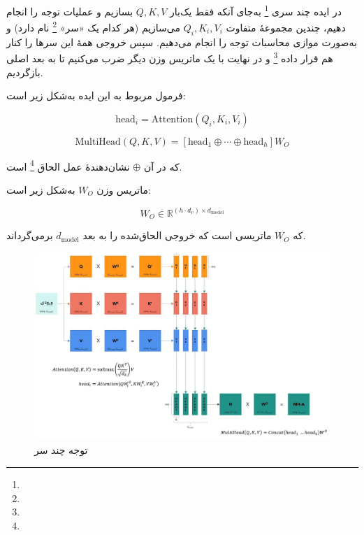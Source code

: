 در ایده چند سری \footnote{}  
به‌جای آنکه فقط یک‌بار \( Q, K, V \) بسازیم و عملیات توجه را انجام دهیم، چندین مجموعهٔ متفاوت \( Q_i, K_i, V_i \) می‌سازیم (هر کدام یک «سر» \footnote{} نام دارد) و به‌صورت موازی محاسبات توجه را انجام می‌دهیم. سپس خروجی همهٔ این سرها را کنار هم قرار داده \footnote{} و در نهایت با یک ماتریس وزن دیگر ضرب می‌کنیم تا به بعد اصلی بازگردیم.

فرمول مربوط به این ایده به‌شکل زیر است:


\begin{equation}
	\text{head}_i = \text{Attention}(Q_i, K_i, V_i)
	\label{eq:head_i}
\end{equation}


\begin{equation}
	\text{MultiHead}(Q, K, V) = [\text{head}_1 \oplus \cdots \oplus \text{head}_h] W_O
	\label{eq:multihead}
\end{equation}

که در آن \( \oplus \) نشان‌دهندهٔ عمل الحاق \footnote{} است.

ماتریس وزن \( W_O \) به‌شکل زیر است:

\[
W_O \in \mathbb{R}^{(h \cdot d_v) \times d_{\text{model}}}
\]

که \( W_O \) ماتریسی است که خروجی الحاق‌شده را به بعد \( d_{\text{model}} \) برمی‌گرداند.





\begin{figure}[h]
	\centering
	\begin{minipage}[b]{0.9\textwidth}
		\centering
		\includegraphics[width=\textwidth]{transformer_images/persian images/b01.png}
		\caption{توجه چند سر}
		\label{fig:attention}
	\end{minipage}
	\hfill
	
\end{figure}



